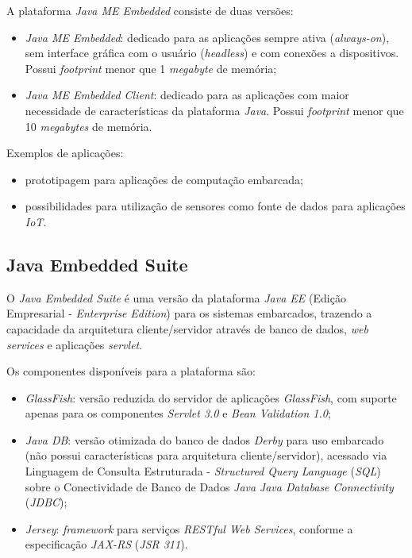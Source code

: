A plataforma \textit{Java ME Embedded} consiste de duas versões:

\begin{itemize}

    \item \textit{Java ME Embedded}: dedicado para as aplicações sempre ativa
    (\textit{always-on}), sem interface gráfica com o usuário
    (\textit{headless}) e com conexões a dispositivos. Possui
    \textit{footprint} menor que 1 \textit{megabyte} de memória;

    \item \textit{Java ME Embedded Client}: dedicado para as aplicações com
    maior necessidade de características da plataforma \textit{Java}. Possui
    \textit{footprint} menor que 10 \textit{megabytes} de memória.

\end{itemize}

Exemplos de aplicações:

\begin{itemize}

    \item prototipagem para aplicações de computação embarcada;

    \item possibilidades para utilização de sensores como fonte de dados para
    aplicações \textit{IoT}.

\end{itemize}

\subsection{Java Embedded Suite}

O \textit{Java Embedded Suite} é uma versão da plataforma \textit{Java EE}
(Edição Empresarial - \textit{Enterprise Edition}) para os sistemas embarcados,
trazendo a capacidade da arquitetura cliente/servidor através de banco de
dados, \textit{web services} e aplicações \textit{servlet}.

Os componentes disponíveis para a plataforma são:

\begin{itemize}

    \item \textit{GlassFish}: versão reduzida do servidor de aplicações
    \textit{GlassFish}, com suporte apenas para os componentes \textit{Servlet
    3.0} e \textit{Bean Validation 1.0};

    \item \textit{Java DB}: versão otimizada do banco de dados \textit{Derby}
    para uso embarcado (não possui características para arquitetura
    cliente/servidor), acessado via Linguagem de Consulta Estruturada -
    \textit{Structured Query Language} (\textit{SQL}) sobre o Conectividade de
    Banco de Dados \textit{Java} \textit{Java Database Connectivity}
    (\textit{JDBC});

    \item \textit{Jersey}: \textit{framework} para serviços \textit{RESTful Web
    Services}, conforme a especificação \textit{JAX-RS} (\textit{JSR 311}).

\end{itemize}


